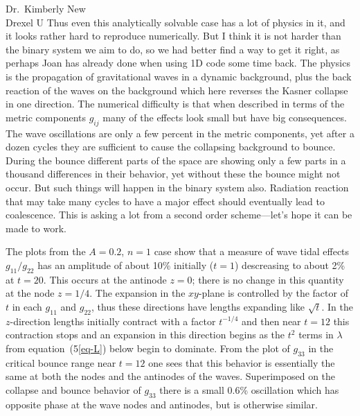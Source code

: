 \begin{letter}{%
Dr.\ Kimberly New\\
Drexel U
}
    Thus even this analytically solvable case has a lot of physics in
it, and it looks rather hard to reproduce numerically.
    But I think it is not harder than the binary system we aim to do,
so we had better find a way to get it right, as perhaps Joan has
already done when using 1D code some time back.
    The physics is the propagation of gravitational waves in a
dynamic background, plus the back reaction of the waves on the
background which here reverses the Kasner collapse in one direction.
    The numerical difficulty is that when described in terms of the
metric components $g_{ij}$ many of the effects look small but have
big consequences.
    The wave oscillations are only a few percent in the metric
components, yet after a dozen cycles they are sufficient to cause the
collapsing background to bounce.
    During the bounce different parts of the space are showing only a
few parts in a thousand differences in their behavior, yet without
these the bounce might not occur.
    But such things will happen in the binary system also.
    Radiation reaction that may take many cycles to have a major
effect should eventually lead to coalescence.
    This is asking a lot from a second order scheme---let's hope it
can be made to work.

     The plots from the $A = 0.2$, $n=1$ case show that a measure of
wave tidal effects $g_{11}/g_{22}$ has an amplitude of about 10\%
initially ($t=1$) descreasing to about 2\% at $t=20$.
    This occurs at the antinode $z=0$; there is no change in this
quantity at the node $z=1/4$.
    The expansion in the $xy$-plane is controlled by the factor of
$t$ in each $g_{11}$ and $g_{22}$, thus these directions have lengths
expanding like $\sqrt{t}$.
    In the $z$-direction lengths initially contract with a factor
$t^{-1/4}$ and then near $t=12$ this contraction stops and an
expansion in this direction begins as the $t^2$ terms in $\lambda$
from equation~(5\ref{eq-L}) below begin to dominate.
    From the plot of $g_{33}$ in the critical bounce range near
$t=12$ one sees that this behavior is essentially the same at both
the nodes and the antinodes of the waves.
    Superimposed on the collapse and bounce behavior of $g_{33}$
there is a small 0.6\% oscillation which has opposite phase at the
wave nodes and antinodes, but is otherwise similar.


\end{letter}
